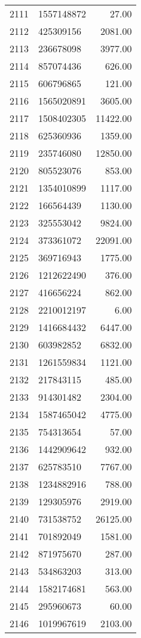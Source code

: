 \begin{table}[ht]
\begin{tabular}{rlr}
  2111 & 1557148872 & 27.00 \\ 
  2112 & 425309156 & 2081.00 \\ 
  2113 & 236678098 & 3977.00 \\ 
  2114 & 857074436 & 626.00 \\ 
  2115 & 606796865 & 121.00 \\ 
  2116 & 1565020891 & 3605.00 \\ 
  2117 & 1508402305 & 11422.00 \\ 
  2118 & 625360936 & 1359.00 \\ 
  2119 & 235746080 & 12850.00 \\ 
  2120 & 805523076 & 853.00 \\ 
  2121 & 1354010899 & 1117.00 \\ 
  2122 & 166564439 & 1130.00 \\ 
  2123 & 325553042 & 9824.00 \\ 
  2124 & 373361072 & 22091.00 \\ 
  2125 & 369716943 & 1775.00 \\ 
  2126 & 1212622490 & 376.00 \\ 
  2127 & 416656224 & 862.00 \\ 
  2128 & 2210012197 & 6.00 \\ 
  2129 & 1416684432 & 6447.00 \\ 
  2130 & 603982852 & 6832.00 \\ 
  2131 & 1261559834 & 1121.00 \\ 
  2132 & 217843115 & 485.00 \\ 
  2133 & 914301482 & 2304.00 \\ 
  2134 & 1587465042 & 4775.00 \\ 
  2135 & 754313654 & 57.00 \\ 
  2136 & 1442909642 & 932.00 \\ 
  2137 & 625783510 & 7767.00 \\ 
  2138 & 1234882916 & 788.00 \\ 
  2139 & 129305976 & 2919.00 \\ 
  2140 & 731538752 & 26125.00 \\ 
  2141 & 701892049 & 1581.00 \\ 
  2142 & 871975670 & 287.00 \\ 
  2143 & 534863203 & 313.00 \\ 
  2144 & 1582174681 & 563.00 \\ 
  2145 & 295960673 & 60.00 \\ 
  2146 & 1019967619 & 2103.00 \\ 

\end{tabular}
\end{table}
